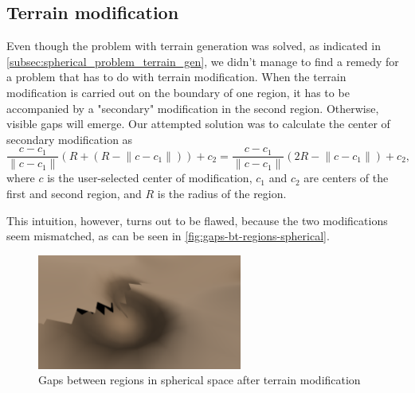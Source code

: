 \subsection{Terrain modification}
Even though the problem with terrain generation was solved, as indicated in \autoref{subsec:spherical_problem_terrain_gen}, we didn't manage to find a remedy for a problem that has to do with terrain modification.
When the terrain modification is carried out on the boundary of one region, it has to be accompanied by a "secondary" modification in the second region.
Otherwise, visible gaps will emerge.
Our attempted solution was to calculate the center of secondary modification as
$$\frac{c - c_1}{\lVert c - c_1 \rVert}(R + (R - \lVert c - c_1 \rVert)) + c_2 = \frac{c - c_1}{\lVert c - c_1 \rVert}(2R - \lVert c - c_1 \rVert) + c_2,$$
where $c$ is the user-selected center of modification, $c_1$ and $c_2$ are centers of the first and second region, and $R$ is the radius of the region.

This intuition, however, turns out to be flawed, because the two modifications seem mismatched, as can be seen in \autoref{fig:gaps-bt-regions-spherical}.
\begin{figure}[!htb]
    \centering
    \includegraphics[width=0.6\textwidth]{chapters/problems/resources/gaps-bt-regions-mining.png}
    \caption{Gaps between regions in spherical space after terrain modification}
    \label{fig:gaps-bt-regions-spherical}
\end{figure}